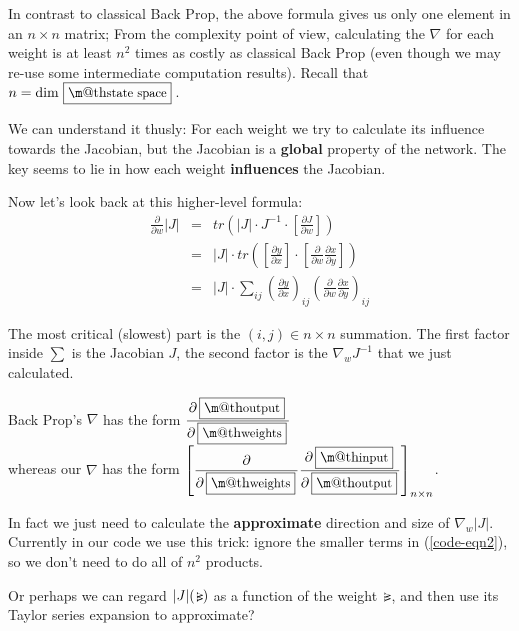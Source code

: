 \documentclass[orivec]{llncs}
\makeatletter
\newcommand{\invw}{\, \rotatebox[origin=c]{90}{w}}
\renewcommand{\boxed}[1]{\fbox{\m@th$\displaystyle\scalebox{0.9}{#1}$} \,}
\makeatother
\begin{document}
In contrast to classical Back Prop, the above formula gives us only one element in an $n \times n$ matrix;  From the complexity point of view, calculating the $\nabla$ for each weight is at least $n^2$ times as costly as classical Back Prop (even though we may re-use some intermediate computation results).  Recall that $n = \mbox{dim } \boxed{\mbox{state space}}$.

We can understand it thusly:  For each weight we try to calculate its influence towards the Jacobian, but the Jacobian is a \textbf{global} property of the network.  The key seems to lie in how each weight \textbf{influences} the Jacobian.

Now let's look back at this higher-level formula:
\begin{eqnarray}
\frac{\partial}{\partial w} |J| &=& tr ( |J| \cdot J^{-1} \cdot \left[ \frac{\partial J}{\partial w} \right] ) \\
&=& |J| \cdot tr ( \left[ \frac{\partial y}{\partial x} \right] \cdot \left[ \frac{\partial }{\partial w} \frac{\partial x}{\partial y} \right] ) \\
&=& |J| \cdot \sum_{i j} \left( \frac{\partial y}{\partial x} \right)_{i j} \left( \frac{\partial }{\partial w} \frac{\partial x}{\partial y} \right)_{i j}
\label{code-eqn2}
\end{eqnarray}

The most critical (slowest) part is the $(i, j) \in n \times n$ summation.  The first factor inside $\sum$ is the Jacobian $J$, the second factor is the $\nabla_w J^{-1}$ that we just calculated. 


Back Prop's $\nabla$ has the form $\displaystyle \frac{\partial \, \boxed{\mbox{output}}}{\partial \, \boxed{\mbox{weights}}}$\\
whereas our $\nabla$ has the form $\displaystyle \left[ \frac{\partial}{\partial \, \boxed{\mbox{weights}}} \frac{\partial \, \boxed{\mbox{input}}}{\partial \, \boxed{\mbox{output}}} \right]_{n \times n}$.

In fact we just need to calculate the \textbf{approximate} direction and size of $\nabla_w |J|$.  Currently in our code we use this trick:  ignore the smaller terms in (\ref{code-eqn2}), so we don't need to do all of $n^2$ products. 

Or perhaps we can regard $|J|(\invw)$ as a function of the weight $\invw$, and then use its Taylor series expansion to approximate?


\end{document}
